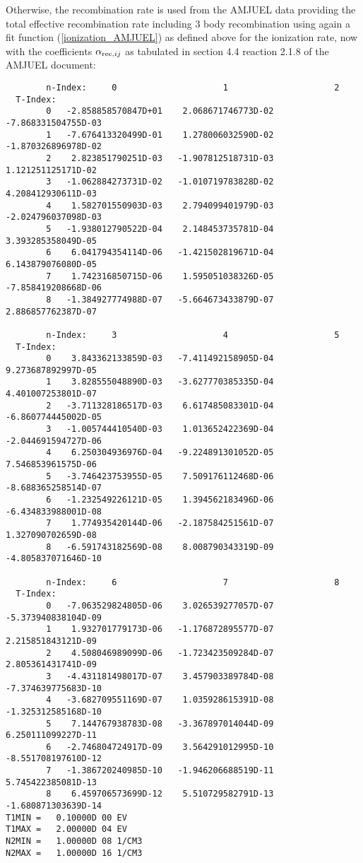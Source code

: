 \documentclass[amsmath,amssymb,a4]{revtex4-2}
\begin{document}
Otherwise, the recombination rate is used from the AMJUEL data providing the total effective recombination rate including 3 body recombination using again a fit function (\ref{ionization_AMJUEL}) as defined above for the ionization rate, now with the coefficients $\alpha_{{\rm rec,} ij}$ as tabulated in section 4.4 reaction 2.1.8 of the AMJUEL document:
\begin{small}\begin{verbatim}
        n-Index:     0                     1                     2
  T-Index:
        0   -2.858858570847D+01    2.068671746773D-02   -7.868331504755D-03
        1   -7.676413320499D-01    1.278006032590D-02   -1.870326896978D-02
        2    2.823851790251D-03   -1.907812518731D-03    1.121251125171D-02
        3   -1.062884273731D-02   -1.010719783828D-02    4.208412930611D-03
        4    1.582701550903D-03    2.794099401979D-03   -2.024796037098D-03
        5   -1.938012790522D-04    2.148453735781D-04    3.393285358049D-05
        6    6.041794354114D-06   -1.421502819671D-04    6.143879076080D-05
        7    1.742316850715D-06    1.595051038326D-05   -7.858419208668D-06
        8   -1.384927774988D-07   -5.664673433879D-07    2.886857762387D-07

        n-Index:     3                     4                     5
  T-Index:
        0    3.843362133859D-03   -7.411492158905D-04    9.273687892997D-05
        1    3.828555048890D-03   -3.627770385335D-04    4.401007253801D-07
        2   -3.711328186517D-03    6.617485083301D-04   -6.860774445002D-05
        3   -1.005744410540D-03    1.013652422369D-04   -2.044691594727D-06
        4    6.250304936976D-04   -9.224891301052D-05    7.546853961575D-06
        5   -3.746423753955D-05    7.509176112468D-06   -8.688365258514D-07
        6   -1.232549226121D-05    1.394562183496D-06   -6.434833988001D-08
        7    1.774935420144D-06   -2.187584251561D-07    1.327090702659D-08
        8   -6.591743182569D-08    8.008790343319D-09   -4.805837071646D-10

        n-Index:     6                     7                     8
  T-Index:
        0   -7.063529824805D-06    3.026539277057D-07   -5.373940838104D-09
        1    1.932701779173D-06   -1.176872895577D-07    2.215851843121D-09
        2    4.508046989099D-06   -1.723423509284D-07    2.805361431741D-09
        3   -4.431181498017D-07    3.457903389784D-08   -7.374639775683D-10
        4   -3.682709551169D-07    1.035928615391D-08   -1.325312585168D-10
        5    7.144767938783D-08   -3.367897014044D-09    6.250111099227D-11
        6   -2.746804724917D-09    3.564291012995D-10   -8.551708197610D-12
        7   -1.386720240985D-10   -1.946206688519D-11    5.745422385081D-13
        8    6.459706573699D-12    5.510729582791D-13   -1.680871303639D-14
T1MIN =   0.10000D 00 EV
T1MAX =   2.00000D 04 EV
N2MIN =   1.00000D 08 1/CM3
N2MAX =   1.00000D 16 1/CM3
\end{verbatim}\end{small}
\end{document}
